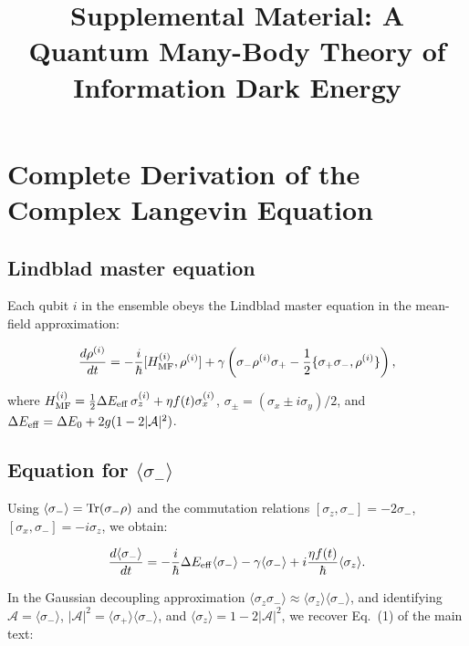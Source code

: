 \documentclass[aps,prd,onecolumn]{revtex4-2}
\begin{document}
\title{Supplemental Material: A Quantum Many-Body Theory of Information Dark Energy}

\maketitle

\section{Complete Derivation of the Complex Langevin Equation}

\subsection{Lindblad master equation}

Each qubit $i$ in the ensemble obeys the Lindblad master equation in the mean-field approximation:

\begin{equation}
\frac{d\rho^{(i)}}{dt} = -\frac{i}{\hbar}[H_{\rm MF}^{(i)}, \rho^{(i)}] + \gamma\left(\sigma_-\rho^{(i)}\sigma_+ - \frac{1}{2}\{\sigma_+\sigma_-, \rho^{(i)}\}\right),
\end{equation}

where $H_{\rm MF}^{(i)} = \frac{1}{2}\Delta E_{\rm eff}\,\sigma_z^{(i)} + \eta f(t)\sigma_x^{(i)}$, $\sigma_\pm = (\sigma_x \pm i\sigma_y)/2$, and $\Delta E_{\rm eff} = \Delta E_0 + 2g(1-2|\mathcal{A}|^2)$.

\subsection{Equation for $\langle\sigma_-\rangle$}

Using $\langle\sigma_-\rangle = {\rm Tr}(\sigma_-\rho)$ and the commutation relations $[\sigma_z, \sigma_-] = -2\sigma_-$, $[\sigma_x, \sigma_-] = -i\sigma_z$, we obtain:

\begin{equation}
\frac{d\langle\sigma_-\rangle}{dt} = -\frac{i}{\hbar}\Delta E_{\rm eff}\langle\sigma_-\rangle - \gamma\langle\sigma_-\rangle + i\frac{\eta f(t)}{\hbar}\langle\sigma_z\rangle.
\end{equation}

In the Gaussian decoupling approximation $\langle\sigma_z\sigma_-\rangle \approx \langle\sigma_z\rangle\langle\sigma_-\rangle$, and identifying $\mathcal{A} = \langle\sigma_-\rangle$, $|\mathcal{A}|^2 = \langle\sigma_+\rangle\langle\sigma_-\rangle$, and $\langle\sigma_z\rangle = 1 - 2|\mathcal{A}|^2$, we recover Eq.~(1) of the main text:
\end{document}
